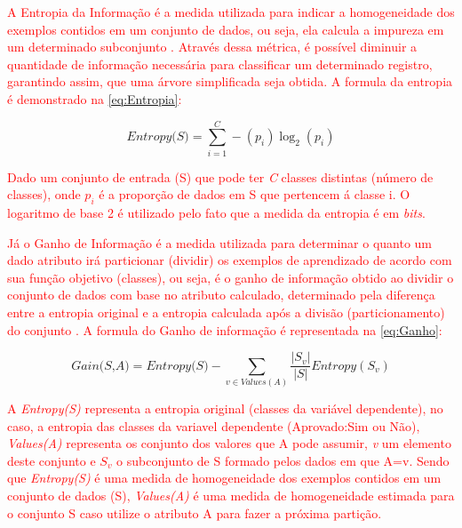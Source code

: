 \par
\textcolor{red}{A Entropia da Informação é a medida utilizada para indicar a homogeneidade dos exemplos contidos em um conjunto de dados, ou seja, ela calcula a impureza em um determinado subconjunto \cite{Carvalho2014}. Através dessa métrica, é possível diminuir a quantidade de informação necessária para classificar um determinado registro, garantindo assim, que uma árvore simplificada seja obtida. A formula da entropia é demonstrado na \autoref{eq:Entropia}:}

\begin{equation}
    \label{eq:Entropia}
        {\textit{Entropy(S)}={\sum_{i=1}^{C} -(p_i)\log_{2}(p_i)}}
\end{equation}

\textcolor{red}{Dado um conjunto de entrada (S) que pode ter \textit{C} classes distintas (número de classes), onde $p_i$ é a proporção de dados em S que pertencem á classe i. O logaritmo de base 2 é utilizado pelo fato que a medida da entropia é em \textit{bits}.}

\par
\textcolor{red}{Já o Ganho de Informação é a medida utilizada para determinar o quanto um dado atributo irá particionar (dividir) os exemplos de aprendizado de acordo com sua função objetivo (classes), ou seja, é o ganho de informação obtido ao dividir o conjunto de dados com base no atributo calculado, determinado pela diferença entre a entropia original e a entropia calculada após a divisão (particionamento) do conjunto \cite{Carvalho2014, Steiner2004}. A formula do Ganho de informação é representada na \autoref{eq:Ganho}:}

\begin{equation}
    \label{eq:Ganho}
        {\textit{Gain(S,A)}={\textit{Entropy(S)} -  \sum_{v \in Values(A)} \frac{|S_v|}{|S|} Entropy(S_v) } }
\end{equation}

\par
\textcolor{red}{A \textit{Entropy(S)} representa a entropia original (classes da variável dependente), no caso, a entropia das classes da variavel dependente (Aprovado:Sim ou Não), \textit{Values(A)} representa os conjunto dos valores que A pode assumir, \textit{v} um elemento deste conjunto e $S_v$ o subconjunto de S formado pelos dados em que A=v. Sendo que \textit{Entropy(S)} é uma medida de homogeneidade  dos exemplos contidos em um conjunto de dados (S), \textit{Values(A)} é uma medida de homogeneidade estimada para o
conjunto S caso utilize o atributo A para fazer a próxima partição.}

